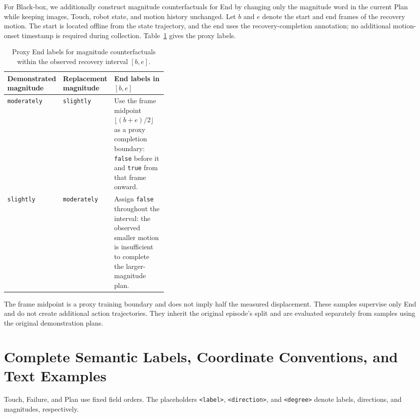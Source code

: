 For Black-box, we additionally construct magnitude counterfactuals for End by changing only the magnitude word in the current Plan while keeping images, Touch, robot state, and motion history unchanged. Let $b$ and $e$ denote the start and end frames of the recovery motion. The start is located offline from the state trajectory, and the end uses the recovery-completion annotation; no additional motion-onset timestamp is required during collection. Table~\ref{tab:app_end_counterfactual} gives the proxy labels.

\begin{table}[t]
\centering
\small
\caption{Proxy End labels for magnitude counterfactuals within the observed recovery interval $[b,e]$.}
\label{tab:app_end_counterfactual}
\setlength{\tabcolsep}{5pt}
\renewcommand{\arraystretch}{1.15}
\begin{tabularx}{\textwidth}{@{}p{0.19\linewidth}p{0.19\linewidth}>{\raggedright\arraybackslash}X@{}}
\toprule
\textbf{Demonstrated magnitude} & \textbf{Replacement magnitude} & \textbf{End labels in $[b,e]$} \\
\midrule
\texttt{moderately} & \texttt{slightly} & Use the frame midpoint $\lfloor(b+e)/2\rfloor$ as a proxy completion boundary: \texttt{false} before it and \texttt{true} from that frame onward. \\
\texttt{slightly} & \texttt{moderately} & Assign \texttt{false} throughout the interval: the observed smaller motion is insufficient to complete the larger-magnitude plan. \\
\bottomrule
\end{tabularx}
\end{table}

The frame midpoint is a proxy training boundary and does not imply half the measured displacement. These samples supervise only End and do not create additional action trajectories. They inherit the original episode's split and are evaluated separately from samples using the original demonstration plans.

\section{Complete Semantic Labels, Coordinate Conventions, and Text Examples}
\label{sec:app_semantics}

Touch, Failure, and Plan use fixed field orders. The placeholders \texttt{<label>}, \texttt{<direction>}, and \texttt{<degree>} denote labels, directions, and magnitudes, respectively.

